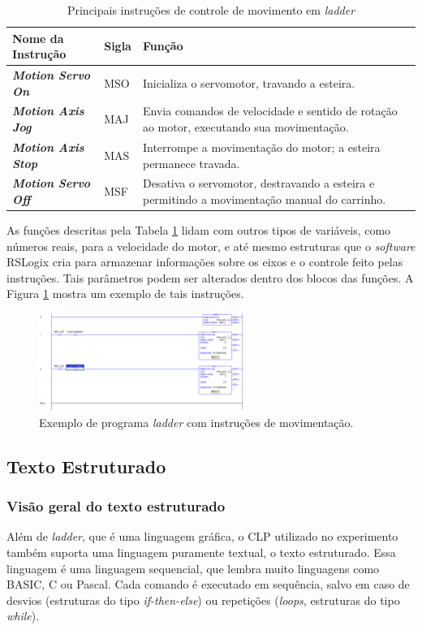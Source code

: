 \begin{table}[!ht]
  \centering
  \caption{Principais instruções de controle de movimento em \textit{ladder} \label{ladder2}}
  \begin{tabularx}{\textwidth}{|>{\bfseries}l|l|X|}
    \hline
    Nome da Instrução & Sigla & Função \\ \hline
    \textit{Motion Servo On} & MSO & Inicializa o servomotor, travando a esteira. \\ \hline
    \textit{Motion Axis Jog} & MAJ & Envia comandos de velocidade e sentido de rotação ao motor, executando sua movimentação. \\ \hline
    \textit{Motion Axis Stop} & MAS & Interrompe a movimentação do motor; a esteira permanece travada. \\ \hline
    \textit{Motion Servo Off} & MSF & 
    Desativa o servomotor, destravando a esteira e permitindo a movimentação manual do carrinho.\\ \hline
  \end{tabularx}
\end{table}

As funções descritas pela Tabela \ref{ladder2} lidam com outros tipos de variáveis, como números reais, para a velocidade do motor, e até mesmo estruturas que o \textit{software} RSLogix cria para armazenar informações sobre os eixos e o controle feito pelas instruções. Tais parâmetros podem ser alterados dentro dos blocos das funções. A Figura \ref{motionladder1} mostra um exemplo de tais instruções.

\begin{figure}[!ht]
  \centering
    \includegraphics[width=0.6\textwidth]{figs/fundamentos/motionladder}
    \caption{Exemplo de programa \textit{ladder} com instruções de movimentação.\label{motionladder1}}
\end{figure}

\subsection{Texto Estruturado}
\subsubsection{Visão geral do texto estruturado}
Além de \textit{ladder}, que é uma linguagem gráfica, o CLP utilizado no experimento também suporta uma linguagem puramente textual, o texto estruturado. Essa linguagem é uma linguagem sequencial, que lembra muito linguagens como BASIC, C ou Pascal. Cada comando é executado em sequência, salvo em caso de desvios (estruturas do tipo \textit{if-then-else}) ou repetições (\textit{loops}, estruturas do tipo \textit{while}).

